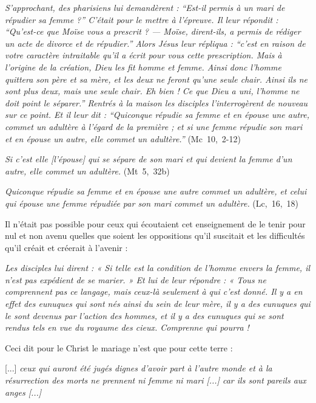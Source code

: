 \begin{displayquote}
\emph{S'approchant, des pharisiens lui demandèrent : \enquote{Est-il permis à un mari de répudier sa femme ?} C'était pour le mettre à l'épreuve. Il leur répondit : \enquote{Qu'est-ce que Moïse vous a prescrit ? --- Moïse, dirent-ils, a permis de rédiger un acte de divorce et de répudier.} Alors Jésus leur répliqua : \enquote{c'est en raison de votre caractère intraitable qu'il a écrit pour vous cette prescription. Mais à l'origine de la création, Dieu les fit homme et femme. Ainsi donc l'homme quittera son père et sa mère, et les deux ne feront qu'une seule chair. Ainsi ils ne sont plus deux, mais une seule chair. Eh bien ! Ce que Dieu a uni, l'homme ne doit point le séparer.} Rentrés à la maison les disciples l'interrogèrent de nouveau sur ce point. Et il leur dit : \enquote{Quiconque répudie sa femme et en épouse une autre, commet un adultère à l'égard de la première ; et si une femme répudie son mari et en épouse un autre, elle commet un adultère.}} (Mc~10,~2-12)

{\emph{Si c'est elle \emph{[l'épouse]} qui se sépare de son mari et qui devient la femme d'un autre, elle commet un adultère.}} (Mt~5,~32b)

{\emph{Quiconque répudie sa femme et en épouse une autre commet un adultère, et celui qui épouse une femme répudiée par son mari commet un adultère.}} (Lc,~16,~18)
 \end{displayquote} 

  Il n'était pas possible pour ceux qui écoutaient cet enseignement de le tenir pour nul et non avenu quelles que soient les oppositions qu'il suscitait et les difficultés qu'il créait et créerait à l'avenir :

\begin{displayquote}[Mt~19,~10-12]
\emph{Les disciples lui dirent : « Si telle est la condition de l'homme envers la femme, il n'est pas expédient de se marier. » Et lui de leur répondre : « Tous ne comprennent pas ce langage, mais ceux-là seulement à qui c'est donné. Il y a en effet des eunuques qui sont nés ainsi du sein de leur mère, il y a des eunuques qui le sont devenus par l'action des hommes, et il y a des eunuques qui se sont rendus tels en vue du royaume des cieux. Comprenne qui pourra !}
\end{displayquote}
 
 Ceci dit pour le Christ le mariage n'est que pour cette terre :

\begin{displayquote}[Luc 20, 34-36]

[...] \emph{ceux qui auront été jugés dignes d'avoir part à l'autre monde et à la résurrection des morts ne prennent ni femme ni mari \emph{[...]} car ils sont pareils aux anges \emph{[...]}}
\end{displayquote}

